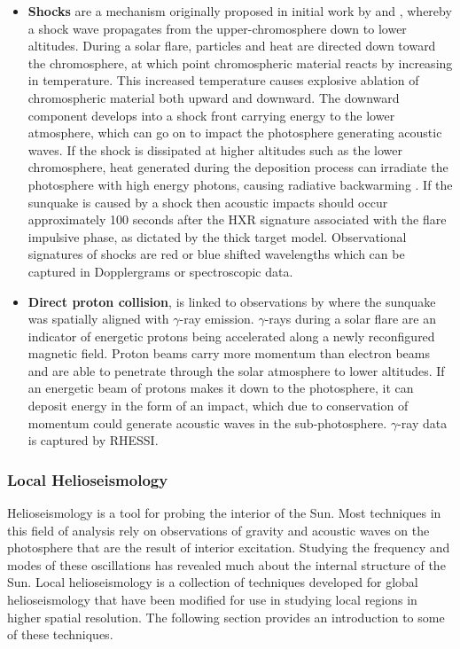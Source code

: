 \begin{itemize}
\item \textbf{Shocks} are a mechanism originally proposed in initial work by \cite{1995ESASP.376b.341K} and \cite{1998Natur.393..317K}, whereby a shock wave propagates from the upper-chromosphere down to lower altitudes. During a solar flare, particles and heat are directed down toward the chromosphere, at which point chromospheric material reacts by increasing in temperature. This increased temperature causes explosive ablation of chromospheric material both upward and downward. The downward component develops into a shock front carrying energy to the lower atmosphere, which can go on to impact the photosphere generating acoustic waves. If the shock is dissipated at higher altitudes such as the lower chromosphere, heat generated during the deposition process can irradiate the photosphere with high energy photons, causing radiative backwarming \citep{1989SoPh..124..303M}. If the sunquake is caused by a shock then acoustic impacts should occur approximately 100 seconds after the HXR signature associated with the flare impulsive phase, as dictated by the thick target model. Observational signatures of shocks are red or blue shifted wavelengths which can be captured in Dopplergrams or spectroscopic data. \\

\item \textbf{Direct proton collision}, is linked to observations by \cite{2007ApJ...664..573Z} where the sunquake was spatially aligned with $\gamma$-ray emission. $\gamma$-rays during a solar flare are an indicator of energetic protons being accelerated along a newly reconfigured magnetic field. Proton beams carry more momentum than electron beams and are able to penetrate through the solar atmosphere to lower altitudes. If an energetic beam of protons makes it down to the photosphere, it can deposit energy in the form of an impact, which due to conservation of momentum could generate acoustic waves in the sub-photosphere. $\gamma$-ray data is captured by RHESSI. \\

\end{itemize}


\subsubsection{Local Helioseismology}
Helioseismology is a tool for probing the interior of the Sun. Most techniques in this field of analysis rely on observations of gravity and acoustic waves on the photosphere that are the result of interior excitation. Studying the frequency and modes of these oscillations has revealed much about the internal structure of the Sun. Local helioseismology is a collection of techniques developed for global helioseismology that have been modified for use in studying local regions in higher spatial resolution. The following section provides an introduction to some of these techniques.


